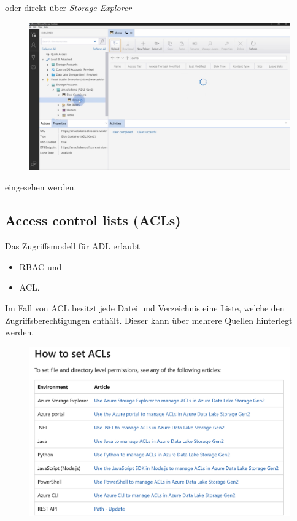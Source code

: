 oder direkt über \textit{Storage Explorer}

\begin{figure}[H]
	\centering
	\includegraphics[scale = 0.2]{attachment/chapter_2/Scc117}
\end{figure}
eingesehen werden.\\

\subsection{Access control lists (ACLs)}
Das Zugriffsmodell für \gls{ADL} erlaubt
\begin{itemize}
	\item \gls{RBAC} und
	\item \gls{ACL}.
\end{itemize}

Im Fall von \gls{ACL} besitzt jede Datei und Verzeichnis eine Liste, welche den Zugriffsberechtigungen enthält. Dieser kann über mehrere Quellen hinterlegt werden.

\begin{figure}[H]
	\centering
	\includegraphics[scale = 0.2]{attachment/chapter_2/Scc119}
\end{figure}

